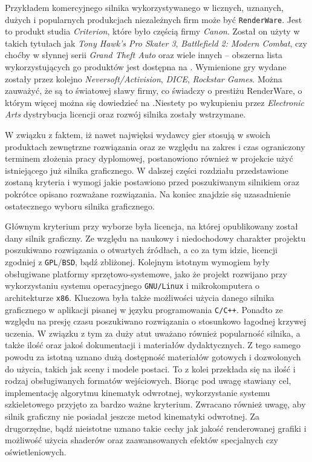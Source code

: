 \documentclass[11pt]{mwrep}
\begin{document}
    Przykładem komercyjnego silnika wykorzystywanego w licznych, uznanych, dużych i popularnych produkcjach niezależnych firm może być \texttt{RenderWare}. Jest to produkt studia \textit{Criterion}, które było częścią firmy \textit{Canon}. Został on użyty w takich tytułach jak \textit{Tony Hawk's Pro Skater 3}, \textit{Battlefield 2: Modern Combat}, czy choćby w słynnej serii \textit{Grand Theft Auto} oraz wiele innych -- obszerna lista wykorzystujących go produktów jest dostępna na \cite{renderware:list}. Wymienione gry wydane zostały przez kolejno  \textit{Neversoft/Activision}, \textit{DICE}, \textit{Rockstar Games}. Można zauważyć, że są to światowej sławy firmy, co świadczy o prestiżu RenderWare, o którym więcej można się dowiedzieć na \cite{renderware}.Niestety po wykupieniu przez \textit{Electronic Arts} dystrybucja licencji oraz rozwój silnika zostały wstrzymane.


    W związku z faktem, iż nawet najwięksi wydawcy gier stosują w swoich produktach zewnętrzne rozwiązania oraz ze względu na zakres i czas ograniczony terminem złożenia pracy dyplomowej, postanowiono również w projekcie użyć istniejącego już silnika graficznego. W dalszej części rozdziału przedstawione zostaną kryteria i wymogi jakie postawiono przed poszukiwanym silnikiem oraz pokrótce opisano rozważane rozwiązania. Na koniec znajdzie się uzasadnienie ostatecznego wyboru silnika graficznego.

    Głównym kryterium przy wyborze była licencja, na której opublikowany został dany silnik graficzny. Ze względu na naukowy i niedochodowy charakter projektu poszukiwano rozwiązania o otwartych źródłach, a co za tym idzie, licencji zgodniej z \texttt{GPL}/\texttt{BSD}, bądź zbliżonej. Kolejnym istotnym wymogiem były obsługiwane platformy sprzętowo-sys\-te\-mo\-we, jako że projekt rozwijano przy wykorzystaniu systemu operacyjnego \texttt{GNU/Linux} i mikrokomputera o architekturze \texttt{x86}.  Kluczowa była także możliwości użycia danego silnika graficznego w aplikacji pisanej w języku programowania \texttt{C/C++}. Ponadto ze względu na presję czasu poszukiwano rozwiązania o stosunkowo łagodnej krzywej uczenia. W związku z tym za duży atut uważano również popularność silnika, a także ilość oraz jakoś dokumentacji i materiałów dydaktycznych. Z tego samego powodu za istotną uznano dużą dostępność materiałów gotowych i dozwolonych do użycia, takich jak sceny i modele postaci. To z kolei przekłada się na ilość i rodzaj obsługiwanych formatów wejściowych. Biorąc pod uwagę stawiany cel, implementację algorytmu kinematyk odwrotnej, wykorzystanie systemu szkieletowego przyjęto za bardzo ważne kryterium. Zwracano również uwagę, aby silnik graficzny nie posiadał jeszcze metod kinematyki odwrotnej. Za drugorzędne, bądź nieistotne uznano takie cechy jak jakość renderowanej grafiki i możliwość użycia shaderów oraz zaawansowanych efektów specjalnych czy oświetleniowych.
\end{document}
